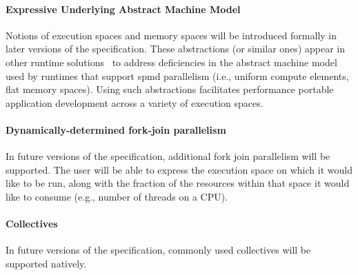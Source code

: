 \paragraph{Expressive Underlying Abstract Machine Model}
Notions of \glspl{execution space} and \glspl{memory space} will be introduced
formally in later
versions of the specification.  These abstractions (or similar ones) appear in other runtime
solutions~\cite{kokkos, others}  to
address deficiencies in the abstract machine model used by runtimes that
support \gls{spmd} parallelism (i.e., uniform compute elements, flat memory
    spaces).  Using such abstractions
facilitates performance portable application development across 
a variety of execution spaces.


\paragraph{Dynamically-determined fork-join parallelism}
In future versions of the specification, additional fork join parallelism will
be supported.  The user will be able to express the \gls{execution space} on
which it would like to be run, along with the fraction of the resources within
that space it would like to consume (e.g., number of threads on a CPU).

\paragraph{Collectives}
In future versions of the specification, commonly used collectives
will be supported natively.

